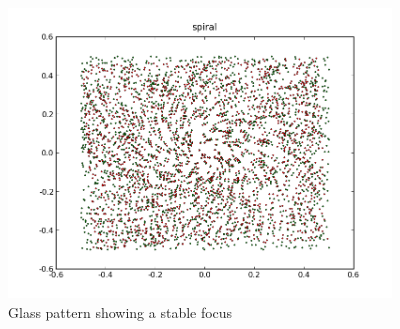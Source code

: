 \begin{center}%
\begin{figure}
\begin{centering}\includegraphics[width=4in]{fig/glass_dots1}\par\end{centering}


\caption{\label{fig:glass_dots1}Glass pattern showing a stable focus}
\end{figure}
\par\end{center}
